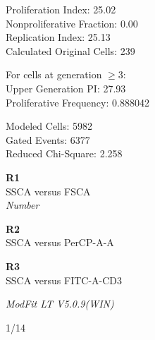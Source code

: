 \documentclass[UTF8,10pt,a4paper,fontset=fandol]{ctexart}
\newcommand{\handwritten}[1]{#1}
\begin{document}
\noindent
Proliferation Index: 25.02\\
Nonproliferative Fraction: 0.00\\
Replication Index: 25.13\\
Calculated Original Cells: 239

\medskip
\noindent
For cells at generation $\geq 3$:\\
Upper Generation PI: 27.93\\
Proliferative Frequency: 0.888042

\medskip
\noindent
Modeled Cells: 5982\\
Gated Events: 6377\\
Reduced Chi-Square: 2.258

\medskip
\noindent
\begin{minipage}{0.31\linewidth}
\centering
\textbf{R1}\\
SSCA versus FSCA\\
\textit{Number}
\end{minipage}
\hfill
\begin{minipage}{0.31\linewidth}
\centering
\textbf{R2}\\
SSCA versus PerCP-A-A\\
\end{minipage}
\hfill
\begin{minipage}{0.31\linewidth}
\centering
\textbf{R3}\\
SSCA versus FITC-A-CD3
\end{minipage}

\medskip
\noindent
\textit{ModFit LT V5.0.9(WIN)}

\handwritten{1/14}

\newpage
\end{document}
